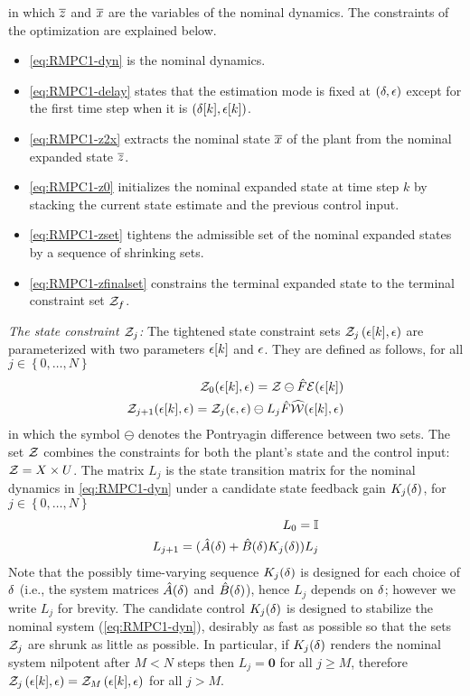 in which $\overline{z}$ and $\overline{x}$
are the variables of the nominal dynamics. The constraints of the
optimization are explained below.
\begin{itemize}
\item \eqref{eq:RMPC1-dyn} is the nominal dynamics.
\item \eqref{eq:RMPC1-delay} states that the estimation mode is fixed at $\left(\delta,\epsilon\right)$
except for the first time step when it is $\left(\delta[k],\epsilon[k]\right)$.
\item \eqref{eq:RMPC1-z2x} extracts the nominal state $\overline{x}$ of the plant
from the nominal expanded state $\overline{z}$.
\item \eqref{eq:RMPC1-z0} initializes the nominal expanded state at time step
$k$ by stacking the current state estimate and the previous control
input.
\item \eqref{eq:RMPC1-zset} tightens the admissible set of the nominal expanded
states by a sequence of shrinking sets.
\item \eqref{eq:RMPC1-zfinalset} constrains the terminal expanded state to
the terminal constraint set $\mathcal{Z}_{f}$.
\end{itemize}

\noindent\textit{The state constraint $\mathcal{Z}_{j}$:}
%
The tightened state constraint sets $\mathcal{Z}_{j}\left(\epsilon[k],\epsilon\right)$
are parameterized with two parameters $\epsilon[k]$ and $\epsilon$.
They are defined as follows, for all $j\in\left\{ 0,\dots,N\right\} $
\begin{eqnarray}
\mathcal{Z}_{0}(\epsilon[k],\epsilon)=\mathcal{Z}\ominus\hat{F} \mathcal{E}(\epsilon[k])\label{eq:RMPC1-Z0}
\\
\mathcal{Z}_{j+1}(\epsilon[k],\epsilon)=\mathcal{Z}_{j}(\epsilon,\epsilon)\ominus L_{j}\hat{F}\widehat{\mathcal{W}}(\epsilon[k],\epsilon)\label{eq:RMPC1-Zj}
\label{eq:RMPC1-Z}
\end{eqnarray} 
in which the symbol $\ominus$
denotes the Pontryagin difference between two sets. The set $\mathcal{Z}$
combines the constraints for both the plant's state and the control
input: $\mathcal{Z}=X\times U$. The matrix $L_{j}$ is the state
transition matrix for the nominal dynamics in \eqref{eq:RMPC1-dyn} under
a candidate state feedback gain $K_{j}(\delta)$, for $j\in\left\{ 0,\dots,N\right\}$
\begin{eqnarray}
\label{eq:RMPC1-L}
L_{0}=\mathbb{I}\label{eq:RMPC1-L0}\\
L_{j+1}=(\hat{A}(\delta)+\hat{B}(\delta)K_{j}(\delta))L_{j}\label{eq:RMPC1-Lj}
\end{eqnarray}
Note that the possibly time-varying sequence $K_{j}(\delta)$ is designed for each choice of $\delta$ (i.e., the system matrices $\hat{A}(\delta)$ and $\hat{B}(\delta)$), hence $L_{j}$ depends on $\delta$; however we write $L_{j}$ for brevity. The candidate control $K_{j}(\delta)$ is designed to stabilize the nominal system (\ref{eq:RMPC1-dyn}), desirably as fast as possible so that the sets $\mathcal{Z}_{j}$ are shrunk as little as possible. In particular, if $K_{j}(\delta)$ renders the nominal system nilpotent after $M<N$ steps then $L_{j}=\bm{0}$ for all $j\geq M$, therefore $\mathcal{Z}_{j}\left(\epsilon[k],\epsilon\right)=\mathcal{Z}_{M}\left(\epsilon[k],\epsilon\right)$ for all $j>M$.


